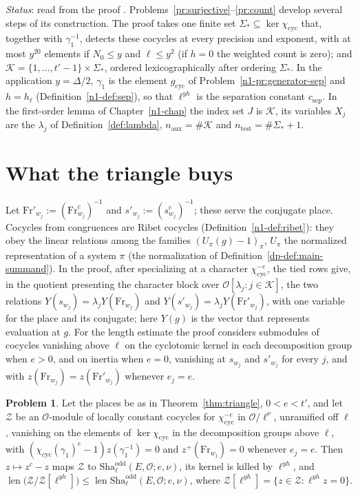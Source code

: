 \documentclass[reqno]{amsart}
\newcounter{chap}
\theoremstyle{definition}
\newtheorem{problem}{Problem}[section]
\theoremstyle{plain}
\newcommand{\Oc}{\mathcal{O}}
\newcommand{\Kc}{\mathcal{K}}
\newcommand{\cyc}{\chi_{\mathrm{cyc}}}
\newcommand{\Fr}{\mathrm{Fr}}
\newcommand{\len}{\operatorname{len}}
\newcommand{\Shao}{\mathrm{Sha}^{\mathrm{odd}}}
\begin{document}
\emph{Status}: read from the proof \cite{GL}.  Problems~\ref{pr:surjective}--\ref{pr:count} develop several steps of its construction.  The proof takes one finite set \(\Sigma_* \subseteq \ker\cyc\) that, together with \(\gamma_1^{-1}\), detects these cocycles at every precision and exponent, with at most \(y^{20}\) elements if \(N_0 \le y\) and \(\ell \le y^2\) (if \(h = 0\) the weighted count is zero); and \(\Kc = \{1,\dots,t'-1\} \times \Sigma_*\), ordered lexicographically after ordering \(\Sigma_*\).  In the application \(y = \Delta/2\), \(\gamma_1\) is the element \(g_{\mathrm{cyc}}\) of Problem~\ref{n1-pr:generator-sep} and \(h = h_\ell\) (Definition~\ref{n1-def:sep}), so that \(\ell^{yh}\) is the separation constant \(c_{\mathrm{sep}}\).  In the first-order lemma of Chapter~\ref{n1-chap} the index set \(J\) is \(\Kc\), its variables \(X_j\) are the \(\lambda_j\) of Definition~\ref{def:lambda}, \(n_{\mathrm{aux}} = \#\Kc\) and \(n_{\mathrm{test}} = \#\Sigma_* + 1\).

\section{What the triangle buys}\label{sec:buys}

Let \(\Fr'_{w_j} := (\Fr_{w_j}^c)^{-1}\) and \(s'_{w_j} := (s_{w_j}^c)^{-1}\); these serve the conjugate place.  Cocycles from congruences are Ribet cocycles (Definition~\ref{n1-def:ribet}): they obey the linear relations among the families \((U_\pi(g) - 1)_\pi\), \(U_\pi\) the normalized representation of a system \(\pi\) (the normalization of Definition~\ref{dp-def:main-summand}).  In the proof, after specializing at a character \(\cyc^{-e}\), the tied rows give, in the quotient presenting the character block over \(\Oc[\lambda_j : j \in \Kc]\), the two relations \(Y(s_{w_j}) = \lambda_j Y(\Fr_{w_j})\) and \(Y(s'_{w_j}) = \lambda_j Y(\Fr'_{w_j})\), with one variable for the place and its conjugate; here \(Y(g)\) is the vector that represents evaluation at \(g\).  For the length estimate the proof considers submodules of cocycles vanishing above \(\ell\) on the cyclotomic kernel in each decomposition group when \(e > 0\), and on inertia when \(e = 0\), vanishing at \(s_{w_j}\) and \(s'_{w_j}\) for every \(j\), and with \(z(\Fr_{w_j}) = z(\Fr'_{w_j})\) whenever \(e_j = e\).

\begin{problem}\label{pr:even-kernel}
Let the places be as in Theorem~\ref{thm:triangle}, \(0 < e < t'\), and let \(\mathcal Z\) be an \(\Oc\)-module of locally constant cocycles for \(\cyc^{-e}\) in \(\Oc/\ell^\nu\), unramified off \(\ell\), vanishing on the elements of \(\ker\cyc\) in the decomposition groups above \(\ell\), with \((\cyc(\gamma_1)^e - 1)z(\gamma_1^{-1}) = 0\) and \(z^+(\Fr_{w_j}) = 0\) whenever \(e_j = e\).  Then \(z \mapsto z^c - z\) maps \(\mathcal Z\) to \(\Shao_\ell(E, \Oc; e, \nu)\), its kernel is killed by \(\ell^{yh}\), and \(\len\bigl(\mathcal Z/\mathcal Z[\ell^{yh}]\bigr) \le \len\Shao_\ell(E,\Oc;e,\nu)\), where \(\mathcal Z[\ell^{yh}] = \{z \in \mathcal Z : \ell^{yh}z = 0\}\).
\end{problem}
\end{document}
